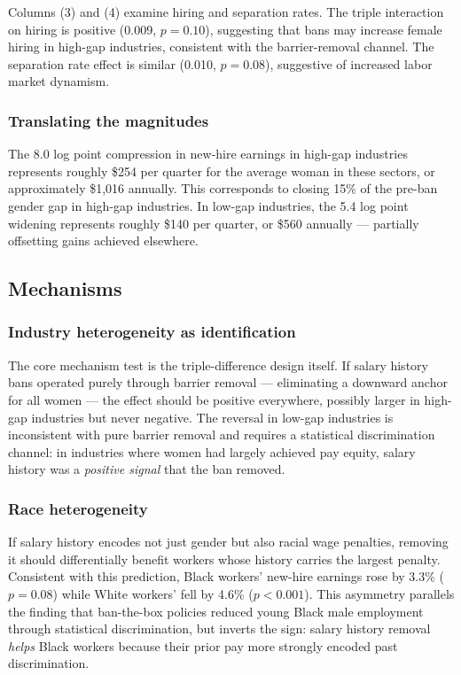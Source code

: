 \documentclass[12pt]{article}
\begin{document}
Columns (3) and (4) examine hiring and separation rates. The triple interaction on hiring is positive (0.009, $p = 0.10$), suggesting that bans may increase female hiring in high-gap industries, consistent with the barrier-removal channel. The separation rate effect is similar (0.010, $p = 0.08$), suggestive of increased labor market dynamism.

\subsubsection*{Translating the magnitudes} The 8.0 log point compression in new-hire earnings in high-gap industries represents roughly \$254 per quarter for the average woman in these sectors, or approximately \$1,016 annually. This corresponds to closing 15\% of the pre-ban gender gap in high-gap industries. In low-gap industries, the 5.4 log point widening represents roughly \$140 per quarter, or \$560 annually --- partially offsetting gains achieved elsewhere.

\subsection{Mechanisms}

\subsubsection*{Industry heterogeneity as identification} The core mechanism test is the triple-difference design itself. If salary history bans operated purely through barrier removal --- eliminating a downward anchor for all women --- the effect should be positive everywhere, possibly larger in high-gap industries but never negative. The reversal in low-gap industries is inconsistent with pure barrier removal and requires a statistical discrimination channel: in industries where women had largely achieved pay equity, salary history was a \emph{positive signal} that the ban removed.

\subsubsection*{Race heterogeneity} If salary history encodes not just gender but also racial wage penalties, removing it should differentially benefit workers whose history carries the largest penalty. Consistent with this prediction, Black workers' new-hire earnings rose by 3.3\% ($p = 0.08$) while White workers' fell by 4.6\% ($p < 0.001$). This asymmetry parallels the \citet{DoleacHansen2020} finding that ban-the-box policies reduced young Black male employment through statistical discrimination, but inverts the sign: salary history removal \emph{helps} Black workers because their prior pay more strongly encoded past discrimination.
\end{document}
